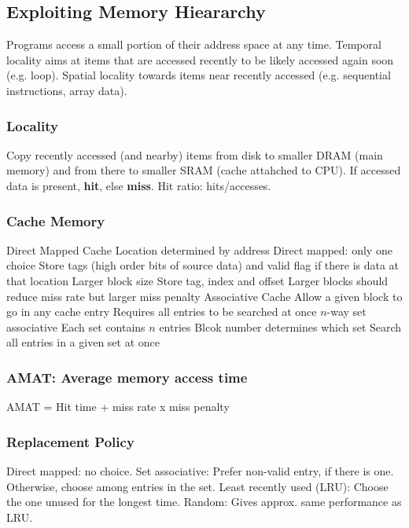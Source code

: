 \documentclass[a4paper, fontsize=8pt, landscape, DIV=1]{scrartcl}
\begin{document}
\begin{multicols*}{4}
  \subsection{Exploiting Memory Hieararchy}
  Programs access a small portion of their address space at any time. Temporal locality aims at items
  that are accessed recently to be likely accessed again soon (e.g. loop). Spatial locality towards
  items near recently accessed (e.g. sequential instructions, array data).

  \subsubsection{Locality}
  Copy recently accessed (and nearby) items from disk to smaller DRAM (main memory) and from there 
  to smaller SRAM (cache attahched to CPU). If accessed data is present, \textbf{hit}, else \textbf{miss}.
  Hit ratio: hits/accesses.

  \subsubsection{Cache Memory}
  \begin{outline}
    \1 Direct Mapped Cache
      \2 Location determined by address
      \2 Direct mapped: only one choice
      \2 Store tags (high order bits of source data) and valid flag if there is data at that location
    \1 Larger block size
      \2 Store tag, index and offset
      \2 Larger blocks should reduce miss rate but larger miss penalty
    \1 Associative Cache
      \2 Allow a given block to go in any cache entry
      \2 Requires all entries to be searched at once
    \1 $n$-way set associative
      \2 Each set contains $n$ entries
      \2 Blcok number determines which set
      \2 Search all entries in a given set at once
  \end{outline}

  \subsubsection{AMAT: Average memory access time}
  AMAT = Hit time + miss rate x miss penalty

  \subsubsection{Replacement Policy}
  Direct mapped: no choice. Set associative: Prefer non-valid entry, if there is one. Otherwise,
  choose among entries in the set. Least recently used (LRU): Choose the one unused for the longest time.
  Random: Gives approx. same performance as LRU.


\end{multicols*}
\end{document}
